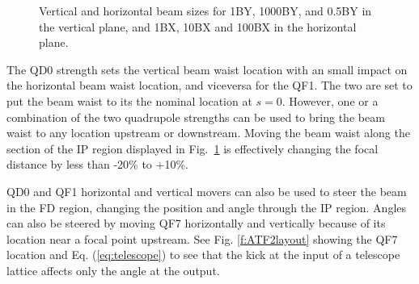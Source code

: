 {{\begin{figure}[h]
\begin{center}
  \caption{Vertical and horizontal beam sizes for 1BY, 1000BY, and 0.5BY in the vertical plane, and 1BX, 10BX and 100BX in the horizontal plane.}\label{f:BXYoptics}
 \end{center}
\end{figure}
The QD0 strength sets the vertical beam waist location with an small impact on the horizontal beam waist location, and viceversa for the QF1. The two are set to put the beam waist to its the nominal location at $s=0$. However, one or a combination of the two quadrupole strengths can be used to bring the beam waist to any location upstream or downstream. Moving the beam waist along the section of the IP region displayed in Fig.~\ref{f:BXYoptics} is effectively changing the focal distance by less than -20\% to +10\%.\par
QD0 and QF1 horizontal and vertical movers can also be used to steer the beam in the FD region, changing the position and angle through the IP region. Angles can also be steered by moving QF7 horizontally and vertically because of its location near a focal point upstream. See Fig. \ref{f:ATF2layout} showing the QF7 location and Eq. (\ref{eq:telescope}) to see that the kick at the input of a telescope lattice affects only the angle at the output.\par


}}
